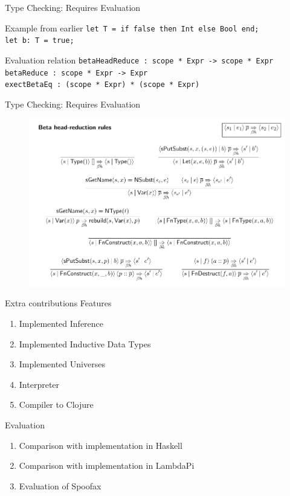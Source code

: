 \documentclass[aspectratio=43]{beamer}
\begin{document}
\begin{frame}[fragile]{Type Checking: Requires Evaluation}
	\begin{exampleblock}{Example from earlier}
		\texttt{let T = if false then Int else Bool end;\\let b: T = true;}
	\end{exampleblock}
	\begin{block}{Evaluation relation} 
		\texttt{betaHeadReduce : scope * Expr -> scope * Expr} \\
		\texttt{betaReduce : scope * Expr -> Expr} \\
		\texttt{exectBetaEq : (scope * Expr) * (scope * Expr)}
	\end{block}
\end{frame}

\begin{frame}[fragile]{Type Checking: Requires Evaluation}
	\begin{figure}
		\includegraphics[width=0.9\linewidth]{screenshot001}
	\end{figure}
	
\end{frame}

\begin{frame}[fragile]{Extra contributions}
Features
\begin{enumerate}
	\item Implemented Inference
	\item Implemented Inductive Data Types
	\item Implemented Universes
	\item Interpreter
	\item Compiler to Clojure
\end{enumerate}
Evaluation
\begin{enumerate}
	\item Comparison with implementation in Haskell
	\item Comparison with implementation in LambdaPi
	\item Evaluation of Spoofax
\end{enumerate}
\end{frame}
\end{document}
